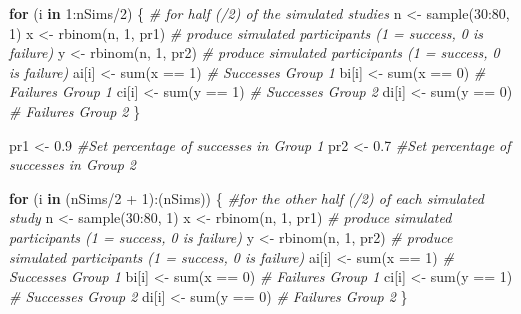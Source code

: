 \documentclass[
  oneside]{book}
\newenvironment{Shaded}{\begin{snugshade}}{\end{snugshade}}
\newcommand{\CommentTok}[1]{\textcolor[rgb]{0.56,0.35,0.01}{\textit{#1}}}
\newcommand{\ControlFlowTok}[1]{\textcolor[rgb]{0.13,0.29,0.53}{\textbf{#1}}}
\newcommand{\DecValTok}[1]{\textcolor[rgb]{0.00,0.00,0.81}{#1}}
\newcommand{\FloatTok}[1]{\textcolor[rgb]{0.00,0.00,0.81}{#1}}
\newcommand{\FunctionTok}[1]{\textcolor[rgb]{0.00,0.00,0.00}{#1}}
\newcommand{\NormalTok}[1]{#1}
\newcommand{\OtherTok}[1]{\textcolor[rgb]{0.56,0.35,0.01}{#1}}
\newcommand{\SpecialCharTok}[1]{\textcolor[rgb]{0.00,0.00,0.00}{#1}}
\begin{document}
\begin{Shaded}
\begin{Highlighting}[]
\ControlFlowTok{for}\NormalTok{ (i }\ControlFlowTok{in} \DecValTok{1}\SpecialCharTok{:}\NormalTok{nSims}\SpecialCharTok{/}\DecValTok{2}\NormalTok{) \{ }\CommentTok{\# for half (/2) of the simulated studies}
\NormalTok{  n }\OtherTok{\textless{}{-}} \FunctionTok{sample}\NormalTok{(}\DecValTok{30}\SpecialCharTok{:}\DecValTok{80}\NormalTok{, }\DecValTok{1}\NormalTok{)}
\NormalTok{  x }\OtherTok{\textless{}{-}} \FunctionTok{rbinom}\NormalTok{(n, }\DecValTok{1}\NormalTok{, pr1) }\CommentTok{\# produce simulated participants (1 = success, 0 is failure)}
\NormalTok{  y }\OtherTok{\textless{}{-}} \FunctionTok{rbinom}\NormalTok{(n, }\DecValTok{1}\NormalTok{, pr2) }\CommentTok{\# produce simulated participants (1 = success, 0 is failure)}
\NormalTok{  ai[i] }\OtherTok{\textless{}{-}} \FunctionTok{sum}\NormalTok{(x }\SpecialCharTok{==} \DecValTok{1}\NormalTok{) }\CommentTok{\# Successes Group 1}
\NormalTok{  bi[i] }\OtherTok{\textless{}{-}} \FunctionTok{sum}\NormalTok{(x }\SpecialCharTok{==} \DecValTok{0}\NormalTok{) }\CommentTok{\# Failures Group 1}
\NormalTok{  ci[i] }\OtherTok{\textless{}{-}} \FunctionTok{sum}\NormalTok{(y }\SpecialCharTok{==} \DecValTok{1}\NormalTok{) }\CommentTok{\# Successes Group 2}
\NormalTok{  di[i] }\OtherTok{\textless{}{-}} \FunctionTok{sum}\NormalTok{(y }\SpecialCharTok{==} \DecValTok{0}\NormalTok{) }\CommentTok{\# Failures Group 2}
\NormalTok{\}}

\NormalTok{pr1 }\OtherTok{\textless{}{-}} \FloatTok{0.9} \CommentTok{\#Set percentage of successes in Group 1}
\NormalTok{pr2 }\OtherTok{\textless{}{-}} \FloatTok{0.7} \CommentTok{\#Set percentage of successes in Group 2}

\ControlFlowTok{for}\NormalTok{ (i }\ControlFlowTok{in}\NormalTok{ (nSims}\SpecialCharTok{/}\DecValTok{2} \SpecialCharTok{+} \DecValTok{1}\NormalTok{)}\SpecialCharTok{:}\NormalTok{(nSims)) \{ }\CommentTok{\#for the other half (/2) of each simulated study}
\NormalTok{  n }\OtherTok{\textless{}{-}} \FunctionTok{sample}\NormalTok{(}\DecValTok{30}\SpecialCharTok{:}\DecValTok{80}\NormalTok{, }\DecValTok{1}\NormalTok{)}
\NormalTok{  x }\OtherTok{\textless{}{-}} \FunctionTok{rbinom}\NormalTok{(n, }\DecValTok{1}\NormalTok{, pr1) }\CommentTok{\# produce simulated participants (1 = success, 0 is failure)}
\NormalTok{  y }\OtherTok{\textless{}{-}} \FunctionTok{rbinom}\NormalTok{(n, }\DecValTok{1}\NormalTok{, pr2) }\CommentTok{\# produce simulated participants (1 = success, 0 is failure)}
\NormalTok{  ai[i] }\OtherTok{\textless{}{-}} \FunctionTok{sum}\NormalTok{(x }\SpecialCharTok{==} \DecValTok{1}\NormalTok{) }\CommentTok{\# Successes Group 1}
\NormalTok{  bi[i] }\OtherTok{\textless{}{-}} \FunctionTok{sum}\NormalTok{(x }\SpecialCharTok{==} \DecValTok{0}\NormalTok{) }\CommentTok{\# Failures Group 1}
\NormalTok{  ci[i] }\OtherTok{\textless{}{-}} \FunctionTok{sum}\NormalTok{(y }\SpecialCharTok{==} \DecValTok{1}\NormalTok{) }\CommentTok{\# Successes Group 2}
\NormalTok{  di[i] }\OtherTok{\textless{}{-}} \FunctionTok{sum}\NormalTok{(y }\SpecialCharTok{==} \DecValTok{0}\NormalTok{) }\CommentTok{\# Failures Group 2}
\NormalTok{\}}


\end{Highlighting}
\end{Shaded}
\end{document}
